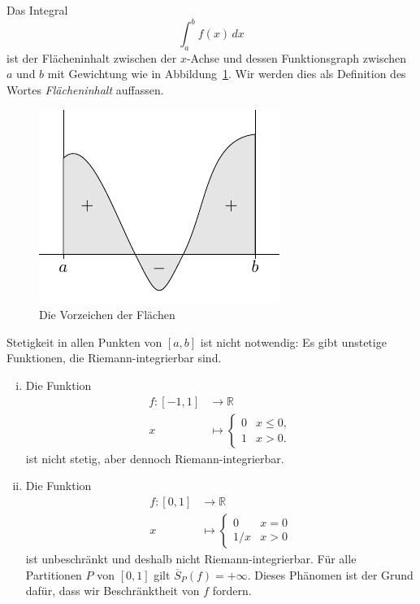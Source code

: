 \documentclass[../main.tex]{subfiles}
\begin{document}
\begin{geometric}
  Das Integral
  \[
    \int_{a}^{b} f(x) \, dx
  \]
  ist der Flächeninhalt zwischen der $x$-Achse und dessen
  Funktionsgraph zwischen $a$ und $b$ mit Gewichtung
  wie in Abbildung~\ref{fig:riemann-integral}.
  Wir werden dies als Definition des Wortes
  \textit{Flächeninhalt} auffassen.
\end{geometric}

\begin{figure}[htb]
  \centering
  \includegraphics{images/riemann-integral}
  \caption{Die Vorzeichen der Flächen}%
  \label{fig:riemann-integral}
\end{figure}

\begin{remark}
  Stetigkeit in allen Punkten von $[a, b]$ ist
  nicht notwendig: Es gibt unstetige Funktionen,
  die Riemann-integrierbar sind.
\end{remark}

\begin{examples}
  \leavevmode
  \begin{enumerate}[(i)]
    \item Die Funktion
      \begin{align*}
        f \colon [-1, 1] & \to \mathbb{R} \\
        x & \mapsto 
        \begin{cases}
          0 & x \leq 0,\\
          1 & x > 0.
        \end{cases}
      \end{align*}
      ist nicht stetig, aber dennoch Riemann-integrierbar.
    \item Die Funktion
      \begin{align*}
        f \colon [0, 1] & \to \mathbb{R} \\
        x & \mapsto 
        \begin{cases}
          0 & x = 0 \\
          1/x & x > 0
        \end{cases}
      \end{align*}
      ist unbeschränkt und deshalb nicht Riemann-integrierbar.
      Für alle Partitionen $P$ von $[0, 1]$ gilt
      $
      \overline S_P(f) = + \infty$.
      Dieses Phänomen ist der Grund dafür, dass
      wir Beschränktheit von $f$ fordern.
  \end{enumerate}
\end{examples}
\end{document}
